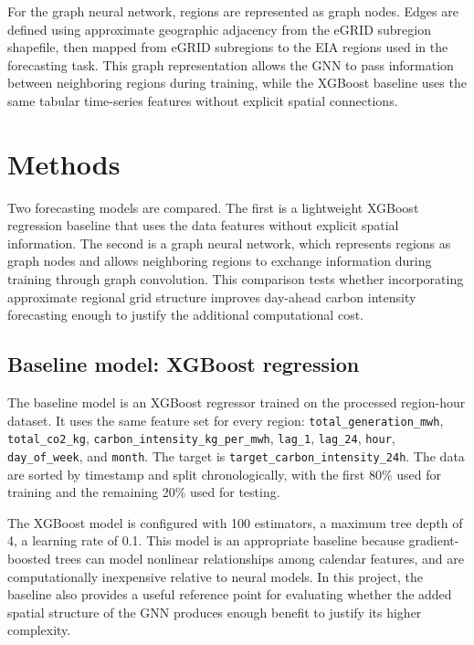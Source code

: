 \documentclass{article}
\begin{document}
For the graph neural network, regions are represented as graph nodes. Edges are defined using approximate geographic adjacency from the eGRID subregion shapefile, then mapped from eGRID subregions to the EIA regions used in the forecasting task. This graph representation allows the GNN to pass information between neighboring regions during training, while the XGBoost baseline uses the same tabular time-series features without explicit spatial connections.

\section{Methods}

Two forecasting models are compared. The first is a lightweight XGBoost regression baseline that uses the data features without explicit spatial information. The second is a graph neural network, which represents regions as graph nodes and allows neighboring regions to exchange information during training through graph convolution. This comparison tests whether incorporating approximate regional grid structure improves day-ahead carbon intensity forecasting enough to justify the additional computational cost.

\subsection{Baseline model: XGBoost regression}

The baseline model is an XGBoost regressor trained on the processed region-hour dataset. It uses the same feature set for every region: \texttt{total\_generation\_mwh}, \texttt{total\_co2\_kg}, \texttt{carbon\_intensity\_kg\_per\_mwh}, \texttt{lag\_1}, \texttt{lag\_24}, \texttt{hour}, \texttt{day\_of\_week}, and \texttt{month}. The target is \texttt{target\_carbon\_intensity\_24h}. The data are sorted by timestamp and split chronologically, with the first 80\% used for training and the remaining 20\% used for testing.

The XGBoost model is configured with 100 estimators, a maximum tree depth of 4, a learning rate of 0.1. This model is an appropriate baseline because gradient-boosted trees can model nonlinear relationships among calendar features, and are computationally inexpensive relative to neural models. In this project, the baseline also provides a useful reference point for evaluating whether the added spatial structure of the GNN produces enough benefit to justify its higher complexity.
\end{document}
